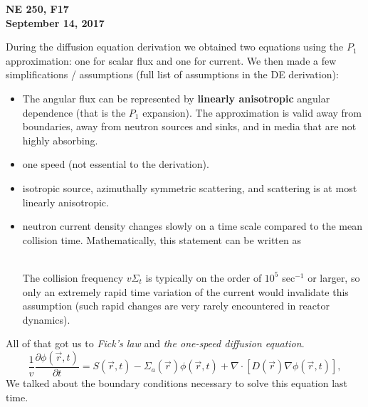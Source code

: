 \documentclass[12pt]{article}
\newif\ifeqns
\newcommand{\rvec}{\ensuremath{\vec{r}}}
\begin{document}
\begin{center}
{\bf NE 250, F17 \\
September 14, 2017}
\end{center}


During the diffusion equation derivation we obtained two equations using the $P_1$ approximation: one for scalar flux and one for current. We then made a few simplifications / assumptions (full list of assumptions in the DE derivation):
\begin{itemize}
\item The angular flux can be represented by \textbf{linearly anisotropic} angular dependence (that is the $P_1$ expansion). 
The approximation is valid away from boundaries, away from neutron sources and sinks, and in media that are not highly absorbing.
\item one speed (not essential to the derivation).
\item isotropic source, azimuthally symmetric scattering, and scattering is at most linearly anisotropic.
\item neutron current density changes slowly on a time scale compared to the mean collision time. Mathematically, this statement can be written as
\ifeqns
\begin{align*}
\frac{1}{|\vec{J}(\rvec,t)|}&\frac{\partial\vec{J}(\rvec,t)}{\partial t} \ll v\Sigma_t \:;\\ \frac{1}{|\vec{J}(\rvec,t)|}&\frac{\partial\vec{J}(\rvec,t)}{\partial t}\approx 0\:.
\end{align*}
\else
\vspace*{7em}\\
\fi
The collision frequency $v\Sigma_t$ is typically on the order of $10^5$ sec$^{-1}$ or larger, so only an extremely rapid time variation of the current would invalidate this assumption (such rapid changes are very rarely encountered in reactor dynamics).
\end{itemize}

All of that got us to \textit{Fick's law} and \textit{the one-speed diffusion equation}.  
%
\begin{equation*}
\frac{1}{v}\frac{\partial\phi(\rvec,t)}{\partial t} = S(\rvec,t) - \Sigma_a(\rvec)\phi(\rvec,t) + 
\nabla\cdot[D(\rvec)\nabla\phi(\rvec,t)],
\end{equation*}
%
We talked about the boundary conditions necessary to solve this equation last time. 
\end{document}
